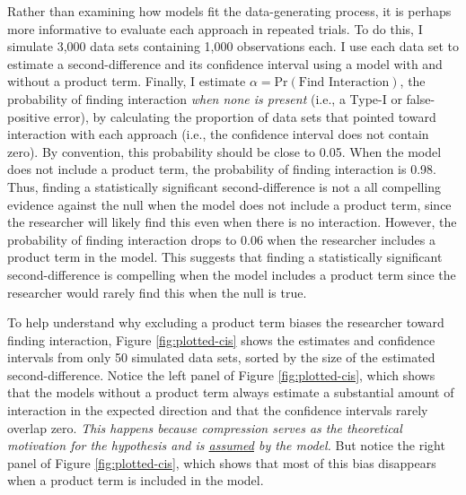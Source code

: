 \documentclass[12pt]{article}
\begin{document}
Rather than examining how models fit the data-generating process, it is perhaps more informative to evaluate each approach in repeated trials. To do this, I simulate 3,000 data sets containing 1,000 observations each. I use each data set to estimate a second-difference and its confidence interval using a model with and without a product term. Finally, I estimate $\alpha = \text{Pr}(\text{Find Interaction})$, the probability of finding interaction \textit{when none is present} (i.e., a Type-I or false-positive error), by calculating the proportion of data sets that pointed toward interaction with each approach (i.e., the confidence interval does not contain zero). By convention, this probability should be close to 0.05. When the model does not include a product term, the probability of finding interaction is 0.98. Thus,  finding a statistically significant second-difference is not a all  compelling evidence against the null when the model does not include a product term, since the researcher will likely find this even when there is no interaction. However, the probability of finding interaction drops to 0.06 when the researcher includes a product term in the model. This suggests that finding a statistically significant second-difference is compelling  when the model includes a product term since the researcher would rarely find this when the null is true.

To help understand why excluding a product term biases the researcher toward finding interaction, Figure \ref{fig:plotted-cis} shows the estimates and confidence intervals from only 50 simulated data sets, sorted by the size of the estimated second-difference. Notice the left panel of Figure \ref{fig:plotted-cis}, which shows that the models without a product term always estimate a substantial amount of interaction in the expected direction  and that the confidence intervals rarely overlap zero. \textit{This happens because compression serves as the theoretical motivation for the hypothesis and is \underline{assumed} by the model.} But notice the right panel of Figure \ref{fig:plotted-cis}, which shows that most of this bias disappears when a product term is included in the model.
\end{document}
